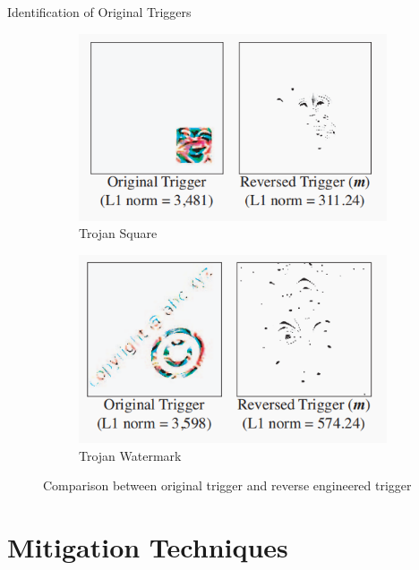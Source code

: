\documentclass{beamer}
\begin{document}
\begin{frame}{Identification of Original Triggers}
\begin{figure}[h!]
\begin{subfigure}{0.3\textwidth}
                \includegraphics[width=\textwidth]{TrojanSquare.png} %
                \caption{Trojan Square}
                \label{fig:revtrigger5}
            \end{subfigure}
            \hfill
            \begin{subfigure}{0.3\textwidth}
                \includegraphics[width=\textwidth]{TrojanWatermark.png} %
                \caption{Trojan Watermark}
                \label{fig:revtrigger6}
            \end{subfigure}
        
        \caption{ Comparison between original trigger and reverse engineered trigger}
        \label{fig:trigger_visualizations}
    \end{figure}

\end{frame}


\section{Mitigation Techniques}
\end{document}
